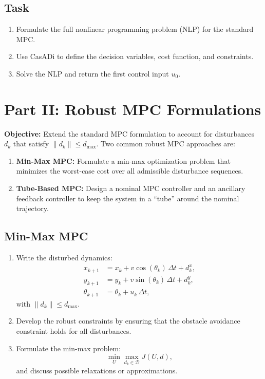 \documentclass[11pt]{article}
\begin{document}
\subsection{Task}
\begin{enumerate}[label=\arabic*.]
    \item Formulate the full nonlinear programming problem (NLP) for the standard MPC.
    \item Use CasADi to define the decision variables, cost function, and constraints.
    \item Solve the NLP and return the first control input $u_0$.
\end{enumerate}

\section{Part II: Robust MPC Formulations}
\textbf{Objective:} Extend the standard MPC formulation to account for disturbances $d_k$ that satisfy $\| d_k \| \le d_{\max}$. Two common robust MPC approaches are:
\begin{enumerate}[label=(\alph*)]
    \item \textbf{Min-Max MPC:} Formulate a min-max optimization problem that minimizes the worst-case cost over all admissible disturbance sequences.
    \item \textbf{Tube-Based MPC:} Design a nominal MPC controller and an ancillary feedback controller to keep the system in a ``tube'' around the nominal trajectory.
\end{enumerate}

\subsection{Min-Max MPC}
\begin{enumerate}[label=\arabic*.]
    \item Write the disturbed dynamics:
    \[
    \begin{aligned}
    x_{k+1} &= x_k + v \cos(\theta_k)\, \Delta t + d^x_k,\\
    y_{k+1} &= y_k + v \sin(\theta_k)\, \Delta t + d^y_k,\\
    \theta_{k+1} &= \theta_k + u_k\, \Delta t,
    \end{aligned}
    \]
    with $\|d_k\| \le d_{\max}$.
    \item Develop the robust constraints by ensuring that the obstacle avoidance constraint holds for all disturbances.
    \item Formulate the min-max problem:
    \[
    \min_{U} \max_{d_k \in \mathcal{D}} J(U, d),
    \]
    and discuss possible relaxations or approximations.
\end{enumerate}
\end{document}

